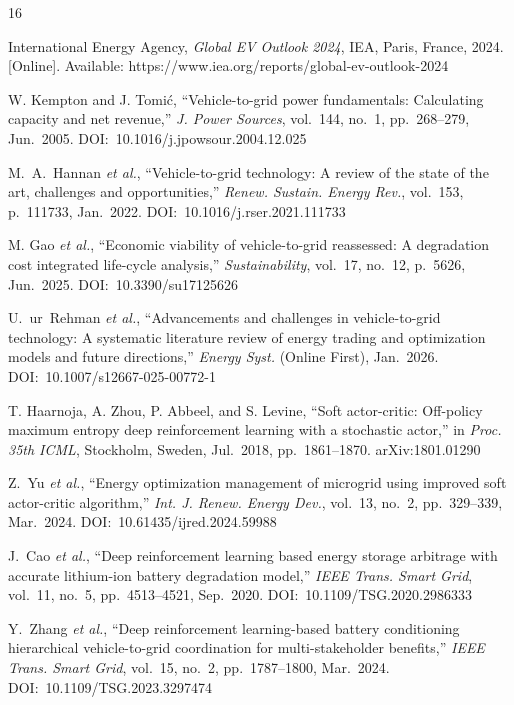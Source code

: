 \documentclass[journal,10pt,twocolumn]{IEEEtran}
\begin{document}
\begin{thebibliography}{16}

International Energy Agency, \textit{Global EV Outlook 2024},
IEA, Paris, France, 2024.
[Online]. Available: https://www.iea.org/reports/global-ev-outlook-2024

W. Kempton and J. Tomi\'{c}, ``Vehicle-to-grid power fundamentals:
Calculating capacity and net revenue,''
\textit{J. Power Sources}, vol.~144, no.~1, pp.~268--279, Jun.~2005.
DOI:~10.1016/j.jpowsour.2004.12.025

M.~A.~Hannan \textit{et al.}, ``Vehicle-to-grid technology:
A review of the state of the art, challenges and opportunities,''
\textit{Renew. Sustain. Energy Rev.}, vol.~153, p.~111733, Jan.~2022.
DOI:~10.1016/j.rser.2021.111733

M. Gao \textit{et al.}, ``Economic viability of vehicle-to-grid
reassessed: A degradation cost integrated life-cycle analysis,''
\textit{Sustainability}, vol.~17, no.~12, p.~5626, Jun.~2025.
DOI:~10.3390/su17125626

U.~ur~Rehman \textit{et al.}, ``Advancements and challenges in
vehicle-to-grid technology: A systematic literature review of energy
trading and optimization models and future directions,''
\textit{Energy Syst.} (Online First), Jan.~2026.
DOI:~10.1007/s12667-025-00772-1

T. Haarnoja, A. Zhou, P. Abbeel, and S. Levine,
``Soft actor-critic: Off-policy maximum entropy deep reinforcement
learning with a stochastic actor,''
in \textit{Proc. 35th ICML}, Stockholm, Sweden, Jul.~2018,
pp.~1861--1870. arXiv:1801.01290

Z.~Yu \textit{et al.},
``Energy optimization management of microgrid using improved soft
actor-critic algorithm,''
\textit{Int. J. Renew. Energy Dev.}, vol.~13, no.~2, pp.~329--339,
Mar.~2024.
DOI:~10.61435/ijred.2024.59988

J.~Cao \textit{et al.},
``Deep reinforcement learning based energy storage arbitrage with accurate
lithium-ion battery degradation model,''
\textit{IEEE Trans. Smart Grid}, vol.~11, no.~5, pp.~4513--4521, Sep.~2020.
DOI:~10.1109/TSG.2020.2986333

Y.~Zhang \textit{et al.},
``Deep reinforcement learning-based battery conditioning hierarchical
vehicle-to-grid coordination for multi-stakeholder benefits,''
\textit{IEEE Trans. Smart Grid}, vol.~15, no.~2, pp.~1787--1800, Mar.~2024.
DOI:~10.1109/TSG.2023.3297474


\end{thebibliography}
\end{document}
